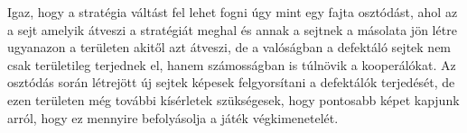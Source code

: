 Igaz, hogy a stratégia váltást fel lehet fogni úgy mint egy fajta osztódást, ahol az a sejt amelyik átveszi a stratégiát meghal és annak a sejtnek a másolata jön létre ugyanazon a területen akitől azt átveszi, de a valóságban a defektáló sejtek nem csak területileg terjednek el, hanem számosságban is túlnövik a kooperálókat.
Az osztódás során létrejött új sejtek képesek felgyorsítani a defektálók terjedését, de ezen területen még további kísérletek szükségesek, hogy pontosabb képet kapjunk arról, hogy ez mennyire befolyásolja a játék végkimenetelét.
